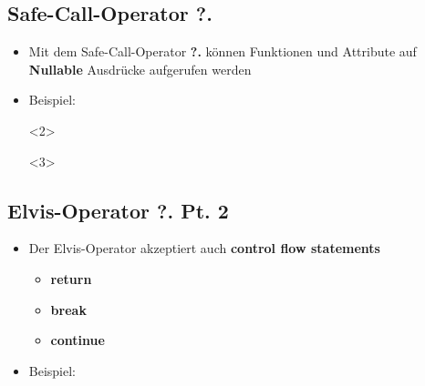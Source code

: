     \subsection{Safe-Call-Operator ?.}\label{subsec:safe-call-operator}
    \begin{frame}
        \slidehead
        \vspace{-1.5em}
        \begin{itemize}
            \item<1-> Mit dem Safe-Call-Operator \textbf{?.} können Funktionen und Attribute auf \textbf{Nullable} Ausdrücke aufgerufen werden
            \item<2-> Beispiel:
            \begin{onlyenv}<2>
            \end{onlyenv}
            \begin{onlyenv}<3>
            \end{onlyenv}
        \end{itemize}
    \end{frame}

    \subsection{Elvis-Operator ?. Pt. 2}\label{subsec:elvis-operator-pt-2}
    \begin{frame}
        \slidehead
        \vspace{-1.5em}
        \begin{itemize}
            [<+->]
            \item Der Elvis-Operator akzeptiert auch \textbf{control flow statements}
            \begin{itemize}
                \item \textbf{return}
                \item \textbf{break}
                \item \textbf{continue}
            \end{itemize}
            \item Beispiel: 
        \end{itemize}
    \end{frame}

    \livecoding


